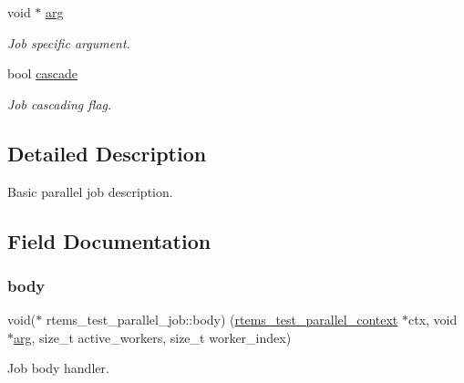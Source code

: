 \begin{DoxyCompactItemize}
\mbox{\label{structrtems__test__parallel__job_a52ddd602bb812999b845a10b44c32954}} 
void $\ast$ \mbox{\hyperlink{structrtems__test__parallel__job_a52ddd602bb812999b845a10b44c32954}{arg}}
\begin{DoxyCompactList}\small\item\em Job specific argument. \end{DoxyCompactList}\item 
bool \mbox{\hyperlink{structrtems__test__parallel__job_ac5f199a12b5bb5ed6062054f2cfcea32}{cascade}}
\begin{DoxyCompactList}\small\item\em Job cascading flag. \end{DoxyCompactList}\end{DoxyCompactItemize}


\subsection{Detailed Description}
Basic parallel job description. 

\subsection{Field Documentation}
\mbox{\label{structrtems__test__parallel__job_aa0e1e25be6484e3995243907de9bdba8}} 
\subsubsection{\texorpdfstring{body}{body}}
{\footnotesize\ttfamily void($\ast$ rtems\+\_\+test\+\_\+parallel\+\_\+job\+::body) (\mbox{\hyperlink{structrtems__test__parallel__context}{rtems\+\_\+test\+\_\+parallel\+\_\+context}} $\ast$ctx, void $\ast$\mbox{\hyperlink{structrtems__test__parallel__job_a52ddd602bb812999b845a10b44c32954}{arg}}, size\+\_\+t active\+\_\+workers, size\+\_\+t worker\+\_\+index)}



Job body handler. 


